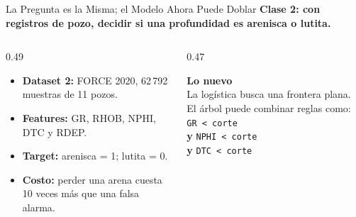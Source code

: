 \documentclass[aspectratio=169, 11pt]{beamer}
\begin{document}
\begin{frame}{La Pregunta es la Misma; el Modelo Ahora Puede Doblar}
  \vspace{-6pt}
  {\small\color{arcaDark}\bfseries
    Clase 2: con registros de pozo, decidir si una profundidad es arenisca o lutita.}

  \vspace{6pt}
  \begin{columns}[T]
    \begin{column}{0.49\textwidth}
      {\footnotesize\color{textMuted}
      \begin{itemize}\setlength{\itemsep}{7pt}
        \item \textbf{Dataset 2:} FORCE 2020, 62\,792 muestras de 11 pozos.
        \item \textbf{Features:} GR, RHOB, NPHI, DTC y RDEP.
        \item \textbf{Target:} arenisca = 1; lutita = 0.
        \item \textbf{Costo:} perder una arena cuesta 10 veces más que una falsa alarma.
      \end{itemize}}
    \end{column}
    \begin{column}{0.47\textwidth}
      \begin{tcolorbox}[colback=arcaGray,colframe=arcaRed,boxrule=0pt,
        leftrule=3pt,arc=3pt,left=7pt,right=7pt,top=7pt,bottom=7pt]
        {\small\color{arcaDark}\bfseries Lo nuevo}\\[5pt]
        {\footnotesize\color{textMuted}
          La logística busca una frontera plana.
          El árbol puede combinar reglas como:\\[5pt]
          \texttt{GR < corte}\\
          \textbf{y} \texttt{NPHI < corte}\\
          \textbf{y} \texttt{DTC < corte}}
      \end{tcolorbox}
    \end{column}
  \end{columns}
\end{frame}
\end{document}
